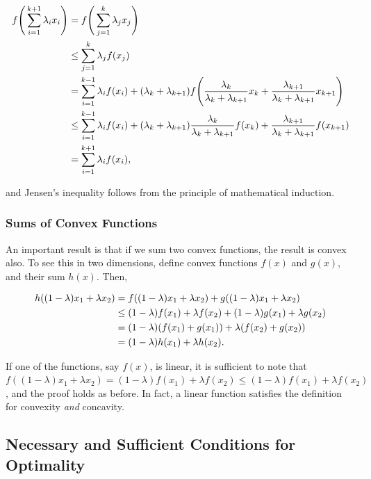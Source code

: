 \documentclass[11pt]{amsart}
\begin{document}
\begin{align}
f\Bigg(\sum_{i=1}^{k+1}\lambda_i x_i\Bigg) &= f\Bigg(\sum_{j=1}^{k}\lambda_j x_j\Bigg) \notag \\
&\leq \sum_{j=1}^k \lambda_jf(x_j) \notag \\
&= \sum_{i=1}^{k-1} \lambda_if(x_i) + (\lambda_k + \lambda_{k+1})f\Bigg(\frac{\lambda_k}{\lambda_k + \lambda_{k+1}}x_k + \frac{\lambda_{k+1}}{\lambda_k + \lambda_{k+1}}x_{k+1}\Bigg) \notag \\
&\leq \sum_{i=1}^{k-1} \lambda_if(x_i) + (\lambda_k + \lambda_{k+1})\frac{\lambda_k}{\lambda_k + \lambda_{k+1}}f(x_k)+ \frac{\lambda_{k+1}}{\lambda_k + \lambda_{k+1}}f(x_{k+1}) \notag \\
&= \sum_{i=1}^{k+1} \lambda_if(x_i) \notag, 
\end{align}

and Jensen's inequality follows from the principle of mathematical induction.

\subsubsection{Sums of Convex Functions}
An important result is that if we sum two convex functions, the result is convex also. To see this in two dimensions, define convex functions $f(x)$ and $g(x)$, and their sum $h(x)$. Then,

\begin{align}
h((1 - \lambda)x_1 + \lambda x_2) &= f((1 - \lambda)x_1 + \lambda x_2) + g((1 - \lambda)x_1 + \lambda x_2) \notag \\
&\leq (1 - \lambda)f(x_1) + \lambda f(x_2) + (1 - \lambda)g(x_1) + \lambda g(x_2) \notag \\
&= (1 - \lambda)(f(x_1) + g(x_1)) + \lambda(f(x_2) + g(x_2)) \notag \\
&= (1 - \lambda)h(x_1) + \lambda h(x_2). \notag
\end{align}

If one of the functions, say $f(x)$, is linear, it is sufficient to note that $f((1 - \lambda)x_1 + \lambda x_2) = (1 - \lambda)f(x_1) + \lambda f(x_2) \leq (1 - \lambda)f(x_1) + \lambda f(x_2)$, and the proof holds as before. In fact, a linear function satisfies the definition for convexity \emph{and} concavity.

\subsection{Necessary and Sufficient Conditions for Optimality}
\end{document}
